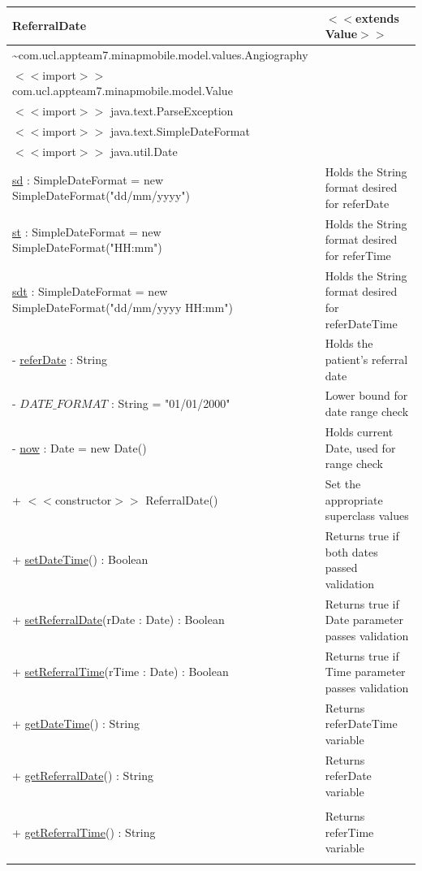 \documentclass[12pt,a4paper,oneside,titlepage]{article}
\begin{document}
\begin{center}
	\begin{tabular}{| p{13cm} | p{5cm} |}
	\hline
	\textbf{ReferralDate} & \textbf{$<<$extends Value$>>$} \\ \hline
	\textasciitilde com.ucl.appteam7.minapmobile.model.values.Angiography	  & \\ \hline
$<<$import$>>$ com.ucl.appteam7.minapmobile.model.Value	 &  \\ \hline
$<<$import$>>$ java.text.ParseException	  & \\ \hline
$<<$import$>>$ java.text.SimpleDateFormat & 	 \\ \hline
$<<$import$>>$ java.util.Date	  & \\ \hline \hline
\underline{sd} : SimpleDateFormat = new SimpleDateFormat("dd/mm/yyyy")	 & Holds the String format desired for referDate \\ \hline
\underline{st} : SimpleDateFormat = new SimpleDateFormat("HH:mm") & 	Holds the String format desired for referTime \\ \hline
\underline{sdt} : SimpleDateFormat = new SimpleDateFormat("dd/mm/yyyy HH:mm")	 & Holds the String format desired for referDateTime \\ \hline
- \underline{referDate} : String & 	Holds the patient's referral date \\ \hline
- \underline{$DATE\_FORMAT$} : String = "01/01/2000"	 & Lower bound for date range check \\ \hline
- \underline{now} : Date = new Date()	 & Holds current Date, used for range check \\ \hline \hline
+ $<<$constructor$>>$ ReferralDate()	 & Set the appropriate superclass values \\ \hline
+ \underline{setDateTime}() : Boolean	 & Returns true if both dates passed validation \\ \hline
+ \underline{setReferralDate}(rDate : Date) : Boolean	 & Returns true if Date parameter passes validation \\ \hline
+ \underline{setReferralTime}(rTime : Date) : Boolean	 & Returns true if Time parameter passes validation \\ \hline
+ \underline{getDateTime}() : String	 & Returns referDateTime variable \\ \hline
+ \underline{getReferralDate}() : String	 & Returns referDate variable \\&\\ \hline
+ \underline{getReferralTime}() : String	 & Returns referTime variable \\&\\ \hline
	\end{tabular}
\end{center}
\end{document}
